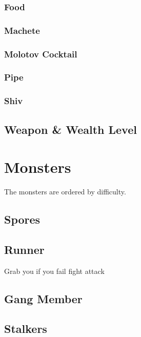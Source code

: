 \documentclass[10pt,twoside,twocolumn]{book}
\begin{document}
\subsection{Food}

\subsection{Machete}

\subsection{Molotov Cocktail}

\subsection{Pipe}

\subsection{Shiv}

\section{Weapon \& Wealth Level}

%
%
\mainmatter
\chapter{Monsters}

The monsters are ordered by difficulty.

\section{Spores}

\section{Runner}

Grab you if you fail fight attack

\section{Gang Member}

\section{Stalkers}
\end{document}
